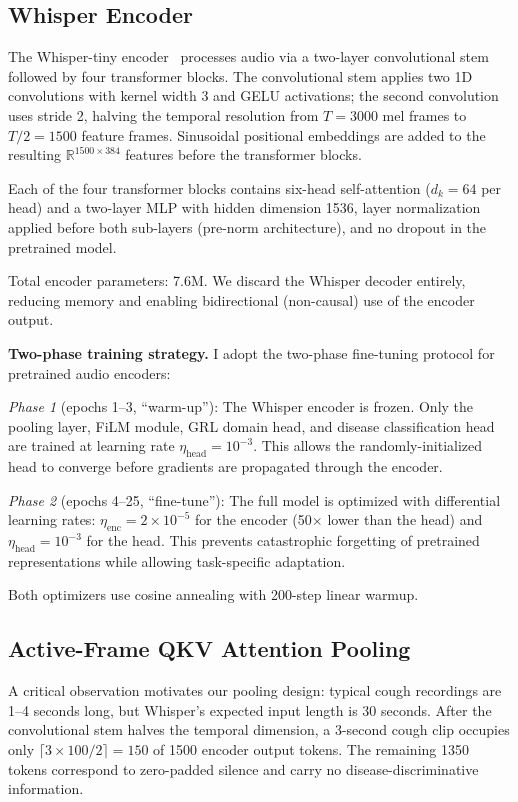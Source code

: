 \documentclass[10pt,journal,compsoc]{IEEEtran}
\begin{document}
\subsection{Whisper Encoder}
\label{sec:whisper_encoder}

The Whisper-tiny encoder~\cite{whisper} processes audio via a two-layer
convolutional stem followed by four transformer blocks.
The convolutional stem applies two 1D convolutions with kernel width 3 and
GELU activations; the second convolution uses stride 2, halving the temporal
resolution from $T=3000$ mel frames to $T/2=1500$ feature frames.
Sinusoidal positional embeddings are added to the resulting
$\mathbb{R}^{1500 \times 384}$ features before the transformer blocks.

Each of the four transformer blocks contains six-head self-attention
($d_k = 64$ per head) and a two-layer MLP with hidden dimension 1536,
layer normalization applied before both sub-layers (pre-norm architecture),
and no dropout in the pretrained model.

Total encoder parameters: 7.6M.
We discard the Whisper decoder entirely, reducing memory and
enabling bidirectional (non-causal) use of the encoder output.

\textbf{Two-phase training strategy.}
I adopt the two-phase fine-tuning protocol for pretrained
audio encoders:

\textit{Phase 1} (epochs 1--3, ``warm-up''): The Whisper encoder is frozen.
Only the pooling layer, FiLM module, GRL domain head, and disease
classification head are trained at learning rate $\eta_\mathrm{head}
= 10^{-3}$. This allows the randomly-initialized head to converge
before gradients are propagated through the encoder.

\textit{Phase 2} (epochs 4--25, ``fine-tune''): The full model is
optimized with differential learning rates:
$\eta_\mathrm{enc} = 2 \times 10^{-5}$ for the encoder (50$\times$
lower than the head) and $\eta_\mathrm{head} = 10^{-3}$ for the head.
This prevents catastrophic forgetting of pretrained representations
while allowing task-specific adaptation.

Both optimizers use cosine annealing with 200-step linear warmup.

\subsection{Active-Frame QKV Attention Pooling}
\label{sec:attnpool}

A critical observation motivates our pooling design:
typical cough recordings are 1--4 seconds long, but Whisper's expected
input length is 30 seconds. After the convolutional stem halves the
temporal dimension, a 3-second cough clip occupies only
$\lceil 3 \times 100 / 2 \rceil = 150$ of 1500 encoder output tokens.
The remaining 1350 tokens correspond to zero-padded silence and carry
no disease-discriminative information.
\end{document}
